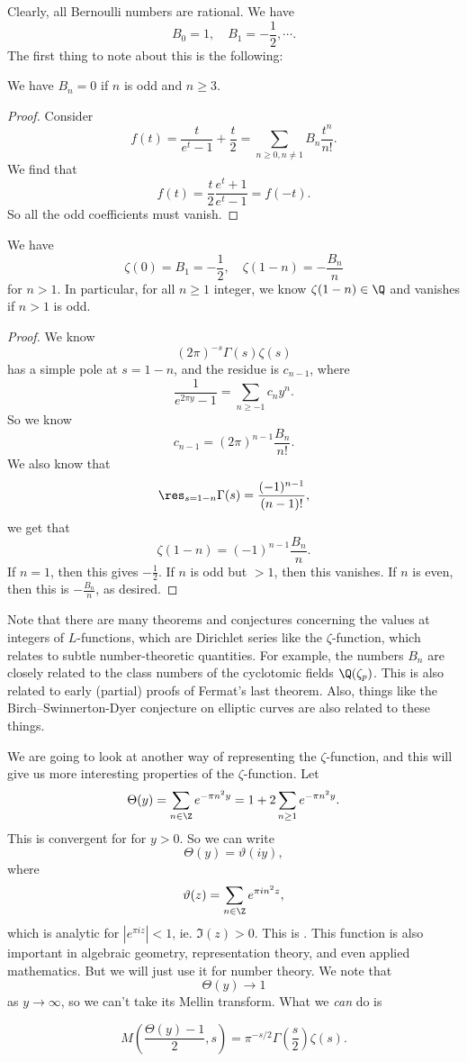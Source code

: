 \documentclass[a4paper]{article}
\begin{document}
Clearly, all Bernoulli numbers are rational. We have
\[
  B_0 = 1, \quad B_1 = -\frac{1}{2}, \cdots.
\]
The first thing to note about this is the following:
\begin{prop}
  We have $B_n = 0$ if $n$ is odd and $n \geq 3$.
\end{prop}

\begin{proof}
  Consider
  \[
    f(t) = \frac{t}{e^t - 1} + \frac{t}{2} = \sum_{n \geq 0, n \not= 1} B_n \frac{t^n}{n!}.
  \]
  We find that
  \[
    f(t) = \frac{t}{2} \frac{e^t + 1}{e^t - 1} = f(-t).
  \]
  So all the odd coefficients must vanish.
\end{proof}

\begin{cor}
  We have
  \[
    \zeta(0) = B_1 = -\frac{1}{2},\quad \zeta(1 - n)= - \frac{B_n}{n}
  \]
  for $n > 1$. In particular, for all $n \geq 1$ integer, we know $\zeta(1 - n) \in \Q$ and vanishes if $n > 1$ is odd.
\end{cor}

\begin{proof}
  We know
  \[
    (2\pi)^{-s} \Gamma(s) \zeta(s)
  \]
  has a simple pole at $s = 1 - n$, and the residue is $c_{n - 1}$, where
  \[
    \frac{1}{e^{2\pi y} - 1} = \sum_{n \geq -1} c_n y^n.
  \]
  So we know
  \[
    c_{n - 1} = (2\pi)^{n - 1} \frac{B_n}{n!}.
  \]
  We also know that
  \[
    \res_{s = 1 - n} \Gamma(s) = \frac{(-1)^{n - 1}}{(n - 1)!},
  \]
  we get that
  \[
    \zeta(1 - n) = (-1)^{n - 1} \frac{B_n}{n}.
  \]
  If $n = 1$, then this gives $-\frac{1}{2}$. If $n$ is odd but $> 1$, then this vanishes. If $n$ is even, then this is $-\frac{B_n}{n}$, as desired.
\end{proof}

Note that there are many theorems and conjectures concerning the values at integers of $L$-functions, which are Dirichlet series like the $\zeta$-function, which relates to subtle number-theoretic quantities. For example, the numbers $B_n$ are closely related to the class numbers of the cyclotomic fields $\Q(\zeta_p)$. This is also related to early (partial) proofs of Fermat's last theorem. Also, things like the Birch--Swinnerton-Dyer conjecture on elliptic curves are also related to these things.

We are going to look at another way of representing the $\zeta$-function, and this will give us more interesting properties of the $\zeta$-function. Let
\[
  \Theta(y) = \sum_{n \in \Z} e^{-\pi n^2 y} = 1 + 2 \sum_{n \geq 1} e^{-\pi n^2 y}.
\]
This is convergent for for $y > 0$. So we can write
\[
  \Theta(y) = \vartheta(iy),
\]
where
\[
  \vartheta(z) = \sum_{n \in \Z} e^{\pi i n^2 z},
\]
which is analytic for $|e^{\pi i z}| < 1$, ie. $\Im(z) > 0$. This is . This function is also important in algebraic geometry, representation theory, and even applied mathematics. But we will just use it for number theory. We note that
\[
  \Theta(y) \to 1
\]
as $y \to \infty$, so we can't take its Mellin transform. What we \emph{can} do is
\begin{prop}
  \[
    M\left(\frac{\Theta(y) - 1}{2}, s\right) = \pi^{-s/2} \Gamma\left(\frac{s}{2}\right) \zeta(s).
  \]
\end{prop}
\end{document}
